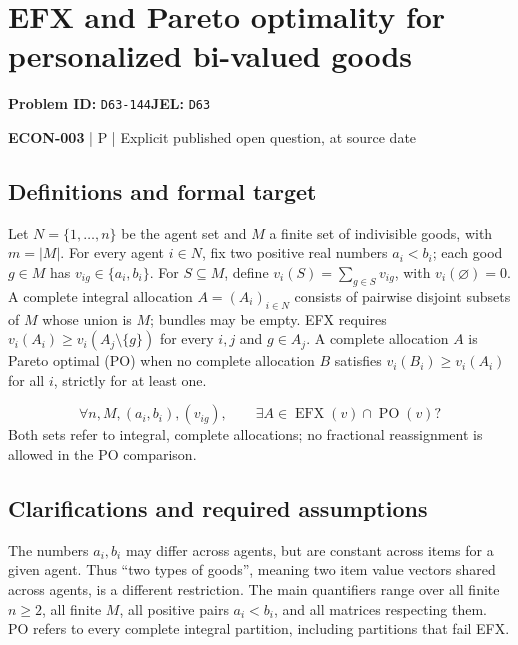 \documentclass[11pt,a4paper]{article}
\begin{document}
\section*{EFX and Pareto optimality for personalized bi-valued goods}
\textbf{Problem ID:} \texttt{D63-144}\quad \textbf{JEL:} \texttt{D63}\par
\label{problem:OP-0590}


\label{audited:ECON-003}

{\sffamily\small\color{muted}\textbf{ECON-003} | P | Explicit published open question, at source date\par}

\subsection*{Definitions and formal target}

Let $N=\{1,\ldots,n\}$ be the agent set and $M$ a finite set of indivisible goods, with $m=|M|$. For every agent $i\in N$, fix two positive real numbers $a_i<b_i$; each good $g\in M$ has $v_{ig}\in\{a_i,b_i\}$. For $S\subseteq M$, define $v_i(S)=\sum_{g\in S}v_{ig}$, with $v_i(\varnothing)=0$. A complete integral allocation $A=(A_i)_{i\in N}$ consists of pairwise disjoint subsets of $M$ whose union is $M$; bundles may be empty. EFX requires $v_i(A_i)\geq v_i(A_j\setminus\{g\})$ for every $i,j$ and $g\in A_j$. A complete allocation $A$ is Pareto optimal (PO) when no complete allocation $B$ satisfies $v_i(B_i)\geq v_i(A_i)$ for all $i$, strictly for at least one.

\[
 \forall n,M,(a_i,b_i),(v_{ig}),\qquad
 \exists A\in\operatorname{EFX}(v)\cap\operatorname{PO}(v)?
\]
Both sets refer to integral, complete allocations; no fractional reassignment is allowed in the PO comparison.

\subsection*{Clarifications and required assumptions}

The numbers $a_i,b_i$ may differ across agents, but are constant across items for a given agent. Thus ``two types of goods'', meaning two item value vectors shared across agents, is a different restriction. The main quantifiers range over all finite $n\geq2$, all finite $M$, all positive pairs $a_i<b_i$, and all matrices respecting them. PO refers to every complete integral partition, including partitions that fail EFX.
\end{document}
